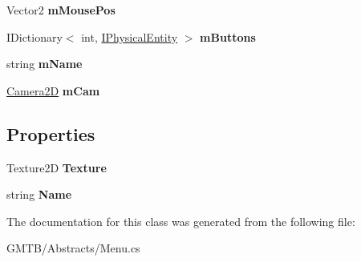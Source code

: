 \begin{DoxyCompactItemize}
\item 
\mbox{\label{class_g_m_t_b_1_1_abstracts_1_1_menu_a35a523be2a98988d1497a1a9f6f8b61f}} 
Vector2 {\bfseries m\+Mouse\+Pos}
\item 
\mbox{\label{class_g_m_t_b_1_1_abstracts_1_1_menu_adb57ada13fdf81a67e4d710399cb16d5}} 
I\+Dictionary$<$ int, \mbox{\hyperlink{interface_g_m_t_b_1_1_interfaces_1_1_i_physical_entity}{I\+Physical\+Entity}} $>$ {\bfseries m\+Buttons}
\item 
\mbox{\label{class_g_m_t_b_1_1_abstracts_1_1_menu_a4b26460f4e522021078bc17a4eb77b8b}} 
string {\bfseries m\+Name}
\item 
\mbox{\label{class_g_m_t_b_1_1_abstracts_1_1_menu_a73744343eafdd3d9823312443a35843a}} 
\mbox{\hyperlink{class_g_m_t_b_1_1_camera2_d}{Camera2D}} {\bfseries m\+Cam}
\end{DoxyCompactItemize}
\subsection*{Properties}
\begin{DoxyCompactItemize}
\item 
\mbox{\label{class_g_m_t_b_1_1_abstracts_1_1_menu_ad2a02eab248f1b05f56444c8a84a7141}} 
Texture2D {\bfseries Texture}
\item 
\mbox{\label{class_g_m_t_b_1_1_abstracts_1_1_menu_ac387ad652491c06ecefb58f2abf52da2}} 
string {\bfseries Name}
\end{DoxyCompactItemize}


The documentation for this class was generated from the following file\+:\begin{DoxyCompactItemize}
\item 
G\+M\+T\+B/\+Abstracts/Menu.\+cs\end{DoxyCompactItemize}
